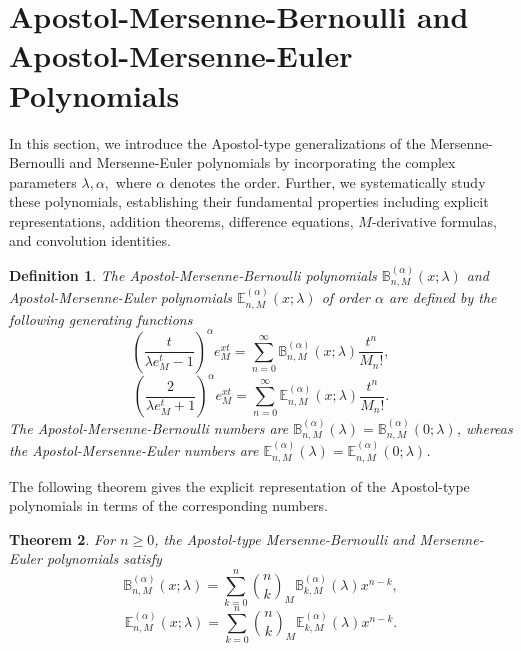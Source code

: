 \documentclass[10pt,a4paper]{amsart}
\newtheorem{theorem}{Theorem}[section]
\newtheorem{definition}[theorem]{Definition}
\numberwithin{equation}{section}
\newcommand{\B}{\mathbb{B}}
\newcommand{\E}{\mathbb{E}}
\begin{document}
\section{Apostol-Mersenne-Bernoulli and Apostol-Mersenne-Euler Polynomials}

In this section, we introduce the Apostol-type generalizations of the Mersenne-Bernoulli and Mersenne-Euler polynomials by incorporating the complex parameters $\lambda,\alpha,$ where $\alpha$ denotes the order. Further, we systematically study these polynomials, establishing their fundamental properties including explicit representations, addition theorems, difference equations, $M$-derivative formulas, and convolution identities. 

\begin{definition}
The Apostol-Mersenne-Bernoulli polynomials $\B_{n,M}^{(\alpha)}(x;\lambda)$ and Apostol-Mersenne-Euler polynomials $\E_{n,M}^{(\alpha)}(x;\lambda)$ of order $\alpha$ are defined by the following generating functions
\begin{equation}\label{eq:apostol-bm-def}
\left(\frac{t}{\lambda e_M^t-1}\right)^\alpha e_M^{xt} = \sum_{n=0}^\infty \B_{n,M}^{(\alpha)}(x;\lambda)\frac{t^n}{M_n!},
\end{equation}
\begin{equation}\label{eq:apostol-em-def}
\left(\frac{2}{\lambda e_M^t+1}\right)^\alpha e_M^{xt} = \sum_{n=0}^\infty \E_{n,M}^{(\alpha)}(x;\lambda)\frac{t^n}{M_n!}.
\end{equation}
The Apostol-Mersenne-Bernoulli numbers are $\B_{n,M}^{(\alpha)}(\lambda)=\B_{n,M}^{(\alpha)}(0;\lambda)$, whereas the Apostol-Mersenne-Euler numbers are $\E_{n,M}^{(\alpha)}(\lambda)=\E_{n,M}^{(\alpha)}(0;\lambda)$. 
\end{definition}

The following theorem gives the explicit representation of the Apostol-type polynomials in terms of the corresponding numbers.

\begin{theorem}\label{thm:explicit}
For $n\ge 0$, the Apostol-type Mersenne-Bernoulli and Mersenne-Euler polynomials satisfy
\begin{equation}\label{eq:apostol-bm-explicit}
\B_{n,M}^{(\alpha)}(x;\lambda) = \sum_{k=0}^n \binom{n}{k}_M \B_{k,M}^{(\alpha)}(\lambda) x^{n-k},
\end{equation}
\begin{equation}\label{eq:apostol-em-explicit}
\E_{n,M}^{(\alpha)}(x;\lambda) = \sum_{k=0}^n \binom{n}{k}_M \E_{k,M}^{(\alpha)}(\lambda) x^{n-k}.
\end{equation}
\end{theorem}
\end{document}
